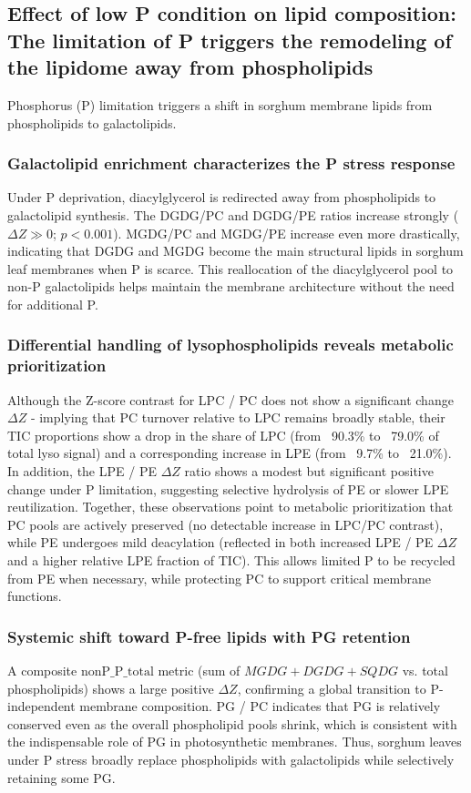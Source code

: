 \documentclass[10pt,letterpaper]{article}
\begin{document}
\subsection*{Effect of low P condition on lipid composition: The limitation of P triggers the remodeling of the lipidome away from phospholipids}

Phosphorus (P) limitation triggers a shift in sorghum membrane lipids from phospholipids to galactolipids.

\subsubsection*{Galactolipid enrichment characterizes the P stress response}
Under P deprivation, diacylglycerol is redirected away from phospholipids to galactolipid synthesis. The DGDG/PC and DGDG/PE ratios increase strongly ($\Delta Z \gg 0$; $p < 0.001$). MGDG/PC and MGDG/PE increase even more drastically, indicating that DGDG and MGDG become the main structural lipids in sorghum leaf membranes when P is scarce. This reallocation of the diacylglycerol pool to non-P galactolipids helps maintain the membrane architecture without the need for additional P.

\subsubsection*{Differential handling of lysophospholipids reveals metabolic prioritization}
Although the Z-score contrast for LPC / PC does not show a significant change $\Delta Z$ - implying that PC turnover relative to LPC remains broadly stable, their TIC proportions show a drop in the share of LPC (from ~90.3\% to ~79.0\% of total lyso signal) and a corresponding increase in LPE (from ~9.7\% to ~21.0\%). In addition, the LPE / PE $\Delta Z$ ratio shows a modest but significant positive change under P limitation, suggesting selective hydrolysis of PE or slower LPE reutilization. Together, these observations point to metabolic prioritization that PC pools are actively preserved (no detectable increase in LPC/PC contrast), while PE undergoes mild deacylation (reflected in both increased LPE / PE $\Delta Z$ and a higher relative LPE fraction of TIC). This allows limited P to be recycled from PE when necessary, while protecting PC to support critical membrane functions.

\subsubsection*{Systemic shift toward P-free lipids with PG retention}
A composite $\mathrm{nonP\_P\_total}$ metric (sum of $MGDG + DGDG + SQDG$ vs. total phospholipids) shows a large positive $\Delta Z$, confirming a global transition to P-independent membrane composition. PG / PC indicates that PG is relatively conserved even as the overall phospholipid pools shrink, which is consistent with the indispensable role of PG in photosynthetic membranes. Thus, sorghum leaves under P stress broadly replace phospholipids with galactolipids while selectively retaining some PG.
\end{document}
